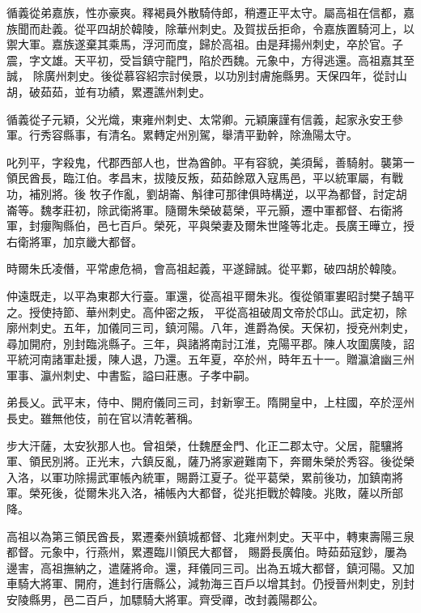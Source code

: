 \begin{pinyinscope}
 循義從弟嘉族，性亦豪爽。釋褐員外散騎侍郎，稍遷正平太守。屬高祖在信都，嘉族聞而赴義。從平四胡於韓陵，除華州刺史。及賀拔岳拒命，令嘉族置騎河上，以禦大軍。嘉族遂棄其乘馬，浮河而度，歸於高祖。由是拜揚州刺史，卒於官。子震，字文雄。天平初，受旨鎮守龍門，陷於西魏。元象中，方得逃還。高祖嘉其至誠，
 除廣州刺史。後從慕容紹宗討侯景，以功別封膚施縣男。天保四年，從討山胡，破茹茹，並有功績，累遷譙州刺史。



 循義從子元穎，父光熾，東雍州刺史、太常卿。元穎廉謹有信義，起家永安王參軍。行秀容縣事，有清名。累轉定州別駕，舉清平勤幹，除漁陽太守。



 叱列平，字殺鬼，代郡西部人也，世為酋帥。平有容貌，美須髯，善騎射。襲第一領民酋長，臨江伯。孝昌末，拔陵反叛，茹茹餘眾入寇馬邑，平以統軍屬，有戰功，補別將。後
 牧子作亂，劉胡崙、斛律可那律俱時構逆，以平為都督，討定胡崙等。魏孝莊初，除武衛將軍。隨爾朱榮破葛榮，平元顥，遷中軍都督、右衛將軍，封癭陶縣伯，邑七百戶。榮死，平與榮妻及爾朱世隆等北走。長廣王曄立，授右衛將軍，加京畿大都督。



 時爾朱氏凌僭，平常慮危禍，會高祖起義，平遂歸誠。從平鄴，破四胡於韓陵。



 仲遠既走，以平為東郡大行臺。軍還，從高祖平爾朱兆。復從領軍婁昭討樊子鵠平之。授使持節、華州刺史。高仲密之叛，
 平從高祖破周文帝於邙山。武定初，除廓州刺史。五年，加儀同三司，鎮河陽。八年，進爵為侯。天保初，授兗州刺史，尋加開府，別封臨洮縣子。三年，與諸將南討江淮，克陽平郡。陳人攻圍廣陵，詔平統河南諸軍赴援，陳人退，乃還。五年夏，卒於州，時年五十一。贈瀛滄幽三州軍事、瀛州刺史、中書監，謚曰莊惠。子孝中嗣。



 弟長乂。武平末，侍中、開府儀同三司，封新寧王。隋開皇中，上柱國，卒於涇州長史。雖無他伎，前在官以清乾著稱。



 步大汗薩，太安狄那人也。曾祖榮，仕魏歷金門、化正二郡太守。父居，龍驤將軍、領民別將。正光末，六鎮反亂，薩乃將家避難南下，奔爾朱榮於秀容。後從榮入洛，以軍功除揚武軍帳內統軍，賜爵江夏子。從平葛榮，累前後功，加鎮南將軍。榮死後，從爾朱兆入洛，補帳內大都督，從兆拒戰於韓陵。兆敗，薩以所部降。



 高祖以為第三領民酋長，累遷秦州鎮城都督、北雍州刺史。天平中，轉東壽陽三泉都督。元象中，行燕州，累遷臨川領民大都督，
 賜爵長廣伯。時茹茹寇鈔，屢為邊害，高祖撫納之，遣薩將命。還，拜儀同三司。出為五城大都督，鎮河陽。又加車騎大將軍、開府，進封行唐縣公，減勃海三百戶以增其封。仍授晉州刺史，別封安陵縣男，邑二百戶，加驃騎大將軍。齊受禪，改封義陽郡公。




\end{pinyinscope}
